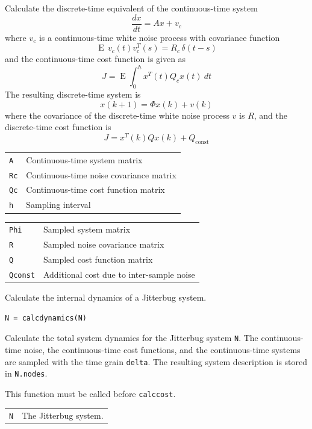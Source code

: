 \documentclass[final,twoside]{rapport}  %
\DeclareMathOperator{\E}{E}
\begin{document}
\descr
Calculate the discrete-time equivalent of the continuous-time
 system
\[
\frac{dx}{dt} = Ax + v_c
\]
where $v_c$ is a continuous-time white noise process with covariance
function 
\[
\E \, v_c(t)v_c^{T}\!(s) = R_c \, \delta(t-s)
\]
and the continuous-time cost function is given as
\[
J = \E \int_0^h x^T(t) Q_c x(t) \ dt
\]
The resulting discrete-time system is
\[
x(k+1) = \Phi x(k) + v(k)
\]
where the covariance of the discrete-time white noise process $v$ is
$R$, and the discrete-time cost function is
\[
J = x^T(k) Q x(k) + Q_\mathrm{const}
\]

\args
\begin{tabularx}{\hsize}{l>{\raggedright\arraybackslash}X}
{\tt A} & Continuous-time system matrix \\
{\tt Rc} & Continuous-time noise covariance matrix \\
{\tt Qc} & Continuous-time cost function matrix \\
{\tt h} & Sampling interval
\end{tabularx}

\retvals
\begin{tabularx}{\hsize}{l>{\raggedright\arraybackslash}X}
  {\tt Phi} & Sampled system matrix \\
  {\tt R} & Sampled noise covariance matrix \\
  {\tt Q} & Sampled cost function matrix \\
  {\tt Qconst} &  Additional cost due to inter-sample noise
\end{tabularx}


\label{sec:calcdynamics}

\purpose
Calculate the internal dynamics of a {\sc Jitterbug} system.

\syntax
\begin{verbatim}
N = calcdynamics(N)
\end{verbatim}

\descr
Calculate the total system dynamics for the {\sc Jitterbug} system
{\tt N}. The continuous-time noise, the continuous-time cost
functions, and the continuous-time systems are sampled with the time
grain {\tt delta}. The resulting system description is stored in
{\tt N.nodes}. 

This function must be called before {\tt calccost}.

\args
\begin{tabularx}{\hsize}{l>{\raggedright\arraybackslash}X}
{\tt N} & The {\sc Jitterbug} system.
\end{tabularx}
\end{document}
